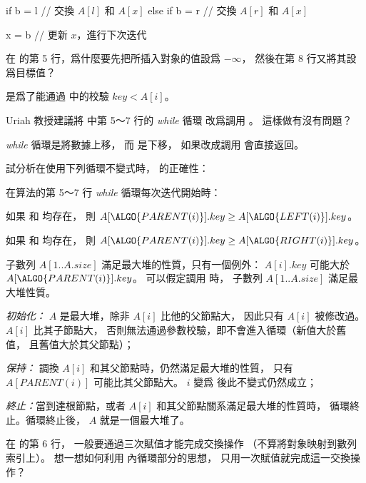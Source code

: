 	if b = l
		// 交換 $A[l]$ 和 $A[x]$
	else if b = r
		// 交換 $A[r]$ 和 $A[x]$

	x = b	// 更新 $x$，進行下次迭代
\stopCLRSCODE
\stopANSWER

\startEXERCISE
在  的第 5 行，爲什麼要先把所插入對象的值設爲 $-\infty$，
然後在第 8 行又將其設爲目標值？
\stopEXERCISE

\startANSWER
是爲了能通過  中的校驗 $key < A[i]$。
\stopANSWER

\startEXERCISE
Uriah 教授建議將  中第 5～7 行的 \emph{while} 循環
改爲調用 。
這樣做有沒有問題？
\stopEXERCISE

\startANSWER
\emph{while} 循環是將數據上移，
而  是下移，
如果改成調用  會直接返回。
\stopANSWER

\startEXERCISE
試分析在使用下列循環不變式時，  的正確性：

在算法的第 5～7 行 \emph{while} 循環每次迭代開始時：
\startigBase[a]
\item 如果  和  均存在，
則 $A[\ALGO{PARENT(i)}].key \ge A[\ALGO{LEFT(i)}].key$。

\item 如果  和  均存在，
則 $A[\ALGO{PARENT(i)}].key \ge A[\ALGO{RIGHT(i)}].key$。

\item 子數列 $A[1..A.size]$ 滿足最大堆的性質，只有一個例外：
$A[i].key$ 可能大於 $A[\ALGO{PARENT(i)}].key$。
\stopigBase
可以假定調用  時，
子數列 $A[1..A.size]$ 滿足最大堆性質。
\stopEXERCISE

\startANSWER
\emph{初始化：} $A$ 是最大堆，除非 $A[i]$ 比他的父節點大，
因此只有 $A[i]$ 被修改過。 $A[i]$ 比其子節點大，
否則無法通過參數校驗，即不會進入循環（新值大於舊值，
 且舊值大於其父節點）；

\emph{保持：} 調換 $A[i]$ 和其父節點時，仍然滿足最大堆的性質，
只有 $A[PARENT(i)]$ 可能比其父節點大。
 $i$ 變爲  後此不變式仍然成立；

\emph{終止：}當到達根節點，或者 $A[i]$ 和其父節點關系滿足最大堆的性質時，
循環終止。循環終止後， $A$ 就是一個最大堆了。
\stopANSWER

\startEXERCISE
在  的第 6 行，
一般要通過三次賦值才能完成交換操作
（不算將對象映射到數列索引上）。
想一想如何利用  內循環部分的思想，
只用一次賦值就完成這一交換操作？
\stopEXERCISE


